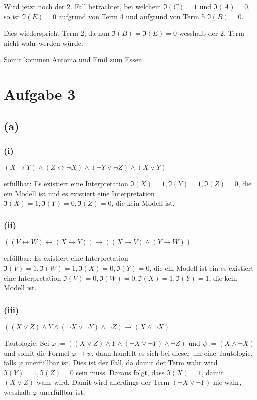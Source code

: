 \documentclass[11pt, a4paper]{article}
\renewcommand{\v}{\vee}
\newcommand{\n}{\wedge}
\newcommand{\interp}{\mathfrak{I}}
\begin{document}
Wird jetzt noch der 2. Fall betrachtet, bei welchem $\interp(C) = 1$ und $\interp(A) = 0$, so ist $\interp(E) = 0$ aufgrund von Term 4 und aufgrund von Term 5 $\interp(B) = 0$.

Dies wiederspricht Term 2, da nun $\interp(B) = \interp(E) = 0$ wesshalb der 2. Term nicht wahr werden würde.

Somit kommen Antonia und Emil zum Essen.


\section*{Aufgabe 3}
\subsection*{(a)}
\subsubsection*{(i)}
$(X \rightarrow Y ) \n (Z \leftrightarrow \neg X) \n (\neg Y \v \neg Z) \n (X \v Y )$

erfüllbar: Es existiert eine Interpretation $\interp(X) = 1, \interp(Y) = 1, \interp(Z) = 0$, die ein Modell ist und es existiert eine Interpretation $\interp(X) = 1, \interp(Y) = 0, \interp(Z) = 0$, die kein Modell ist.

\subsubsection*{(ii)}
$((V \leftrightarrow W ) \leftrightarrow (X \leftrightarrow Y )) \rightarrow ((X \rightarrow V ) \n (Y \rightarrow W ))$

erfüllbar: Es existiert eine Interpretation $\interp(V) = 1, \interp(W) = 1, \interp(X) = 0, \interp(Y) = 0$, die ein Modell ist ein es existiert eine Interpretation $\interp(V) = 0, \interp(W) = 0, \interp(X) = 1, \interp(Y) = 1$, die kein Modell ist.

\subsubsection*{(iii)}
$((X \v Z) \n Y \n (\neg X \v \neg Y ) \n \neg Z) \rightarrow (X \n \neg X)$

Tautologie: Sei $\varphi := ((X \v Z) \n Y \n (\neg X \v \neg Y ) \n \neg Z)$ und $\psi := (X \n \neg X)$ und somit die Formel $\varphi \rightarrow \psi$, dann handelt es sich bei dieser um eine Tautologie, falls $\varphi$ unerfüllbar ist.
Dies ist der Fall, da damit der Term wahr wird $\interp(Y) = 1, \interp(Z) = 0$ sein muss. Daraus folgt, dass $\interp(X) = 1$, damit $(X \v Z)$ wahr wird.
Damit wird allerdings der Term $(\neg X \v \neg Y)$ nie wahr, wesshalb $\varphi$ unerfüllbar ist.
\end{document}
